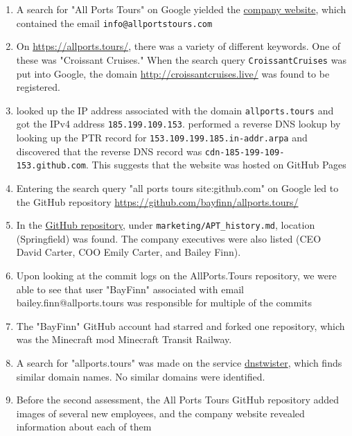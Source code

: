 \begin{enumerate}
    \item A search for "All Ports Tours" on Google yielded the  \href{https://allports.tours/}{company website}, which contained the email \texttt{info@allportstours.com}
    \item On \href{https://allports.tours/}{https://allports.tours/}, there was a variety of different keywords. One of these was "Croissant Cruises." When the search query \texttt{CroissantCruises} was put into Google, the domain \href{http://croissantcruises.live/}{http://croissantcruises.live/} was found to be registered.
    \item \team looked up the IP address associated with the domain \texttt{allports.tours} and got the IPv4 address \texttt{185.199.109.153}. \team performed a reverse DNS lookup by looking up the PTR record for \texttt{153.109.199.185.in-addr.arpa} and discovered that the reverse DNS record was \texttt{cdn-185-199-109-153.github.com}. This suggests that the website was hosted on GitHub Pages
    \item Entering the search query "all ports tours site:github.com" on Google led \team to the GitHub repository \href{https://github.com/bayfinn/allports.tours/}{https://github.com/bayfinn/allports.tours/}
    \item In the \href{https://github.com/bayfinn/allports.tours/}{GitHub repository}, under \texttt{marketing/APT\_history.md}, \clientP location (Springfield) was found. The company executives were also listed (CEO David Carter, COO Emily Carter, and Bailey Finn).
    \item Upon looking at the commit logs on the AllPorts.Tours repository, we were able to see that user "BayFinn" associated with email bailey.finn@allports.tours was responsible for multiple of the commits
    \item The "BayFinn" GitHub account had starred and forked one repository, which was the Minecraft mod Minecraft Transit Railway.
    \item A search for "allports.tours" was made on the service \href{https://dnstwister.report/}{dnstwister}, which finds similar domain names. No similar domains were identified.
    \item Before the second assessment, the All Ports Tours GitHub repository added images of several new employees, and the company website revealed information about each of them 

\end{enumerate}

